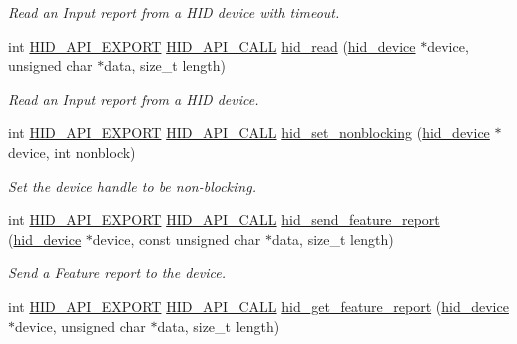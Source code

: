 \begin{DoxyCompactItemize}
\begin{DoxyCompactList}\small\item\em Read an Input report from a H\-I\-D device with timeout. \end{DoxyCompactList}\item 
int \hyperlink{osx_2hidapi_8h_aa60150016800ccb88fdf140e8553ae13}{H\-I\-D\-\_\-\-A\-P\-I\-\_\-\-E\-X\-P\-O\-R\-T} \hyperlink{osx_2hidapi_8h_af140a25716604e86096670a505a58ee0}{H\-I\-D\-\_\-\-A\-P\-I\-\_\-\-C\-A\-L\-L} \hyperlink{group__API_ga6b820f3e72097cf7f994e33715dc7af1}{hid\-\_\-read} (\hyperlink{linux_2hidapi_8h_aa6da74d5686d198dd3e5440e60088fcc}{hid\-\_\-device} $\ast$device, unsigned char $\ast$data, size\-\_\-t length)
\begin{DoxyCompactList}\small\item\em Read an Input report from a H\-I\-D device. \end{DoxyCompactList}\item 
int \hyperlink{osx_2hidapi_8h_aa60150016800ccb88fdf140e8553ae13}{H\-I\-D\-\_\-\-A\-P\-I\-\_\-\-E\-X\-P\-O\-R\-T} \hyperlink{osx_2hidapi_8h_af140a25716604e86096670a505a58ee0}{H\-I\-D\-\_\-\-A\-P\-I\-\_\-\-C\-A\-L\-L} \hyperlink{group__API_gaf9d54208d314047727598b506577bb87}{hid\-\_\-set\-\_\-nonblocking} (\hyperlink{linux_2hidapi_8h_aa6da74d5686d198dd3e5440e60088fcc}{hid\-\_\-device} $\ast$device, int nonblock)
\begin{DoxyCompactList}\small\item\em Set the device handle to be non-\/blocking. \end{DoxyCompactList}\item 
int \hyperlink{osx_2hidapi_8h_aa60150016800ccb88fdf140e8553ae13}{H\-I\-D\-\_\-\-A\-P\-I\-\_\-\-E\-X\-P\-O\-R\-T} \hyperlink{osx_2hidapi_8h_af140a25716604e86096670a505a58ee0}{H\-I\-D\-\_\-\-A\-P\-I\-\_\-\-C\-A\-L\-L} \hyperlink{group__API_gae43ab80f741786ac4374216658fd5ab3}{hid\-\_\-send\-\_\-feature\-\_\-report} (\hyperlink{linux_2hidapi_8h_aa6da74d5686d198dd3e5440e60088fcc}{hid\-\_\-device} $\ast$device, const unsigned char $\ast$data, size\-\_\-t length)
\begin{DoxyCompactList}\small\item\em Send a Feature report to the device. \end{DoxyCompactList}\item 
int \hyperlink{osx_2hidapi_8h_aa60150016800ccb88fdf140e8553ae13}{H\-I\-D\-\_\-\-A\-P\-I\-\_\-\-E\-X\-P\-O\-R\-T} \hyperlink{osx_2hidapi_8h_af140a25716604e86096670a505a58ee0}{H\-I\-D\-\_\-\-A\-P\-I\-\_\-\-C\-A\-L\-L} \hyperlink{group__API_ga34d43ac6da0fb785b88fcc2edf13ed65}{hid\-\_\-get\-\_\-feature\-\_\-report} (\hyperlink{linux_2hidapi_8h_aa6da74d5686d198dd3e5440e60088fcc}{hid\-\_\-device} $\ast$device, unsigned char $\ast$data, size\-\_\-t length)

\end{DoxyCompactItemize}

